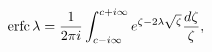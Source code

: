 \[\mathop{\mathrm{erfc}\/}\nolimits\lambda=\frac{1}{2\pi i}\int_{c-i\infty}^{c+i%
\infty}e^{\zeta-2\lambda\sqrt{\zeta}}\frac{d\zeta}{\zeta},\]